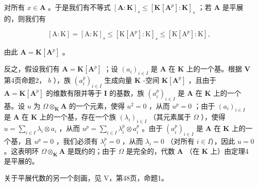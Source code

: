 对所有 \(x \in \mathbf{A}\) 。于是我们有不等式 \([\mathbf{A} : \mathbf{K}]_s \leqslant [\mathbf{K}[\mathbf{A}^p] : \mathbf{K}]_s\) ；若 \(\mathbf{A}\) 是平展的，则我们有

\[
[ \mathrm{A}: \mathrm{K} ] = [ \mathrm{A}: \mathrm{K} ] _ {s} \leqslant [ \mathrm{K} [ \mathrm{A} ^ {p} ]: \mathrm{K} ] _ {s} \leqslant [ \mathrm{K} [ \mathrm{A} ^ {p} ]: \mathrm{K} ],
\]

由此 \(\mathbf{A} = \mathbf{K}[\mathbf{A}^p]\) 。

反之，假设我们有 \(\mathbf{A} = \mathbf{K}[\mathbf{A}^p]\) ；设 \((a_i)_{i\in I}\) 是 \(\mathbf{A}\) 在 \(\mathbf{K}\) 上的一个基。根据 \(\mathbf{V}\) 第4页命题2， \(b\) ），族 \((a_i^p)_{i\in I}\) 生成向量 \(\mathbf{K}\) -空间 \(\mathbf{K}[\mathbf{A}^p]\) ，且由于 \(\mathbf{A} = \mathbf{K}[\mathbf{A}^p]\) 的维数有限并等于 \(\mathbf{I}\) 的基数，族 \((a_i^p)_{i\in I}\) 是 \(\mathbf{A}\) 在 \(\mathbf{K}\) 上的一个基。设 \(u\) 为 \(\Omega \otimes_{\mathbf{K}} \mathbf{A}\) 的一个元素，使得 \(u^2 = 0\) ，从而 \(u^p = 0\) ；由于 \((a_i)_{i\in I}\) 是 \(\mathbf{A}\) 在 \(\mathbf{K}\) 上的一个基，存在一个族 \((\lambda_i)_{i\in I}\) （其元素属于 \(\Omega\) ），使得 \(u = \sum_{i\in I} \lambda_i \otimes a_i\) ，从而 \(u^p = \sum_{i\in I} \lambda_i^p \otimes a_i^p\) 。由于 \((a_i^p)_{i\in I}\) 是 \(\mathbf{A}\) 在 \(\mathbf{K}\) 上的一个基，且 \(u^p = 0\) ，我们必须有 \(\lambda_i^p = 0\) ，从而 \(\lambda_i = 0\) （对所有 \(i\in I\)），因此 \(u = 0\) 。这表明环 \(\Omega \otimes_{\mathbf{K}} \mathbf{A}\) 是既约的；由于 \(\Omega\) 是完全的，代数 \(\mathbf{A}\) （在 \(\mathbf{K}\) 上）由定理4是平展的。

关于平展代数的另一个刻画，见 V，第48页，命题1。

